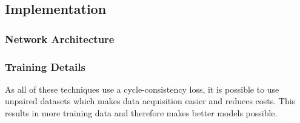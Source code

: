 \subsection{Implementation}
\subsubsection{Network Architecture}
\subsubsection{Training Details}


As all of these techniques use a cycle-consistency loss, it is possible to use unpaired datasets which makes data acquisition easier and reduces costs. This results in more training data and therefore makes better models possible. 












